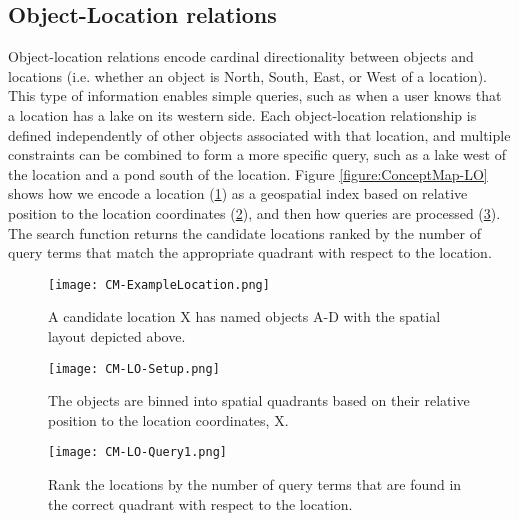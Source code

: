 \subsection{Object-Location relations}
Object-location relations encode cardinal directionality between objects and locations (i.e. whether an object is North, South, East, or West of a location). 
This type of information enables simple queries, such as when a user knows that a location has a lake on its western side. 
Each object-location relationship is defined independently of other objects associated with that location, and multiple constraints can be combined to form a more specific query, such as a lake west of the location and a pond south of the location.
Figure \ref{figure:ConceptMap-LO} shows how we encode a location (\ref{fig:CM-LO-Example}) as a geospatial index based on relative position to the location coordinates (\ref{fig:CM-LO-Setup}), and then how queries are processed (\ref{fig:CM-LO-Query}).
The search function returns the candidate locations ranked by the number of query terms that match the appropriate quadrant with respect to the location. 

\begin{figure*}[h]
    \centering
    \begin{subfigure}[t]{.25\textwidth}
        \texttt{[image: CM-ExampleLocation.png]}
        \caption{\small A candidate location X has named objects A-D with the spatial layout depicted above.} 
        \label{fig:CM-LO-Example}
    \end{subfigure}
    \hfill
    \begin{subfigure}[t]{.25\textwidth}
        \texttt{[image: CM-LO-Setup.png]}
        \caption{\small The objects are binned into spatial quadrants based on their relative position to the location coordinates, X.} 
        \label{fig:CM-LO-Setup}
    \end{subfigure}
    \hfill
        \begin{subfigure}[t]{.25\textwidth}
        \texttt{[image: CM-LO-Query1.png]}
        \caption{\small Rank the locations by the number of query terms that are found in the correct quadrant with respect to the location.}
        \label{fig:CM-LO-Query}
    \hfill
    \end{subfigure}
    \caption{\textbf{Object-Location Search Method. A Location-centric data structure (Figure \ref{fig:CM-LO-Setup}) is generated based on the cardinal relations between the objects and the location (Figure \ref{fig:CM-LO-Example}). Then a pictorial query is matched against the structure (Figure \ref{fig:CM-LO-Query}).}}\label{figure:ConceptMap-LO} 
\end{figure*}



